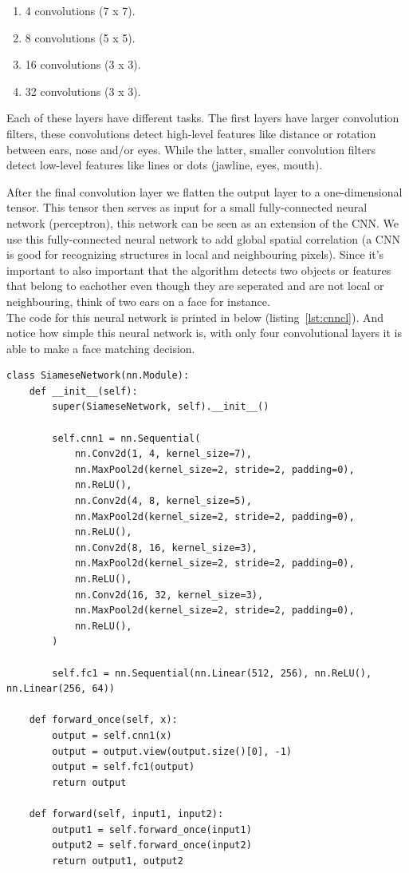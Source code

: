 \begin{enumerate}
  \item 4 convolutions (7 x 7).
  \item 8 convolutions (5 x 5).
  \item 16 convolutions (3 x 3).
  \item 32 convolutions (3 x 3).
\end{enumerate}

Each of these layers have different tasks. The first layers have larger convolution filters, these convolutions detect high-level features like distance or rotation between ears, nose and/or eyes. While the latter, smaller convolution filters detect low-level features like lines or dots (jawline, eyes, mouth).

After the final convolution layer we flatten the output layer to a one-dimensional tensor. This tensor then serves as input for a small fully-connected neural network (perceptron), this network can be seen as an extension of the CNN. We use this fully-connected neural network to add global spatial correlation (a CNN is good for recognizing structures in local and neighbouring pixels). Since it's important to also important that the algorithm detects two objects or features that belong to eachother even though they are seperated and are not local or neighbouring, think of two ears on a face for instance.\\

The code for this neural network is printed in below (listing~\ref{lst:cnncl}). And notice how simple this neural network is, with only four convolutional layers it is able to make a face matching decision.

\begin{lstlisting}[caption={Code for CNN with contrastive loss}, label={lst:cnncl}, frame=single, breaklines=true]
class SiameseNetwork(nn.Module):
    def __init__(self):
        super(SiameseNetwork, self).__init__()

        self.cnn1 = nn.Sequential(
            nn.Conv2d(1, 4, kernel_size=7),
            nn.MaxPool2d(kernel_size=2, stride=2, padding=0),
            nn.ReLU(),
            nn.Conv2d(4, 8, kernel_size=5),
            nn.MaxPool2d(kernel_size=2, stride=2, padding=0),
            nn.ReLU(),
            nn.Conv2d(8, 16, kernel_size=3),
            nn.MaxPool2d(kernel_size=2, stride=2, padding=0),
            nn.ReLU(),
            nn.Conv2d(16, 32, kernel_size=3),
            nn.MaxPool2d(kernel_size=2, stride=2, padding=0),
            nn.ReLU(),
        )

        self.fc1 = nn.Sequential(nn.Linear(512, 256), nn.ReLU(), nn.Linear(256, 64))

    def forward_once(self, x):
        output = self.cnn1(x)
        output = output.view(output.size()[0], -1)
        output = self.fc1(output)
        return output

    def forward(self, input1, input2):
        output1 = self.forward_once(input1)
        output2 = self.forward_once(input2)
        return output1, output2
\end{lstlisting}

